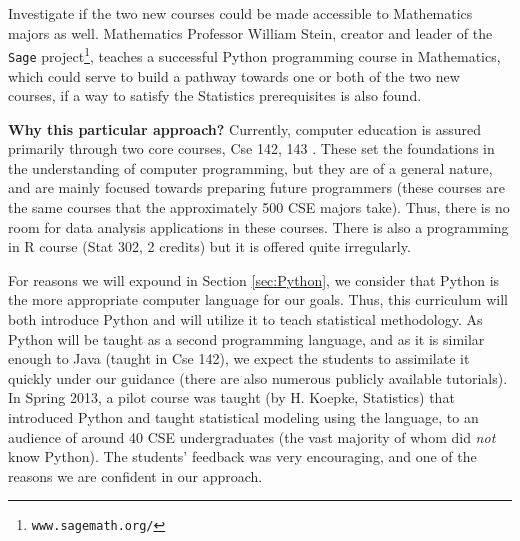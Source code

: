 Investigate if the two new courses could be
made accessible to Mathematics majors as well. Mathematics Professor
William Stein, creator and leader of the {\tt Sage}
project\footnote{{\tt www.sagemath.org/}}, teaches a successful Python
programming course in Mathematics, which could serve to build a
pathway towards one or both of the two new courses, if a way to
satisfy the Statistics prerequisites is also found.


{\bf Why this particular approach?} Currently, computer education is
assured primarily through two core courses, {\sc Cse 142, 143}
\cite{Reges:java}. These set the foundations in the understanding of
computer programming, but they are of a general nature, and are mainly
focused towards preparing future programmers  (these courses are the
same courses that the approximately 500 CSE majors take). Thus, there
is no room for data analysis applications in these courses.  There is
also a programming in R course ({\sc Stat 302}, 2 credits) but it is 
offered quite irregularly.

For reasons we will expound in Section \ref{sec:Python}, we
consider that Python is the more appropriate computer language for our
goals. Thus, this curriculum will both introduce Python and will utilize it to
teach statistical methodology.  As Python will be taught as a second
programming language, and as it is similar enough to Java (taught in
{\sc Cse 142}), we expect the students to assimilate it quickly under our
guidance (there are also numerous publicly available tutorials).
In Spring 2013, a pilot course was taught (by H. Koepke,
Statistics) that introduced Python and taught statistical modeling
using the language, to an audience of around 40 CSE undergraduates
(the vast majority of whom did {\em not} know Python). The students'
feedback was very encouraging, and one of the reasons we are confident
in our approach.


